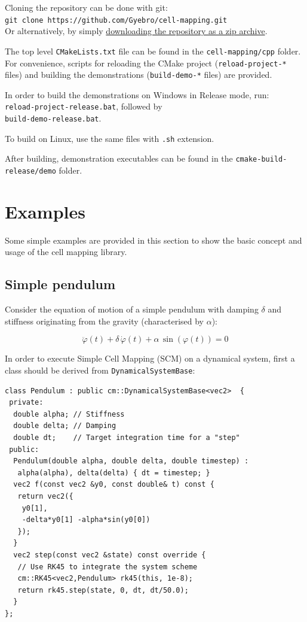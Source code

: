 \documentclass[11pt]{article}
\begin{document}
Cloning the repository can be done with git:\\
\texttt{git clone https://github.com/Gyebro/cell-mapping.git}\\
Or alternatively, by simply  \href{https://github.com/Gyebro/cell-mapping/archive/master.zip}{downloading the repository as a zip archive}.

The top level \texttt{CMakeLists.txt} file can be found in the \texttt{cell-mapping/cpp} folder. For convenience, scripts for reloading the CMake project (\texttt{reload-project-*} files) and building the demonstrations (\texttt{build-demo-*} files) are provided.

In order to build the demonstrations on Windows in Release mode, run:\\
\texttt{reload-project-release.bat}, followed by\\
\texttt{build-demo-release.bat}.

To build on Linux, use the same files with \texttt{.sh} extension.

After building, demonstration executables can be found in the \texttt{cmake-build-release/demo} folder.

\section{Examples}

Some simple examples are provided in this section to show the basic concept and usage of the cell mapping library.

\subsection{Simple pendulum}

Consider the equation of motion of a simple pendulum with damping $\delta$ and stiffness originating from the gravity (characterised by $\alpha$):

\[\ddot\varphi(t) + \delta\,\dot\varphi(t) + \alpha\,\sin(\varphi(t))=0\]

In order to execute Simple Cell Mapping (SCM) on a dynamical system, first a class should be derived from \texttt{DynamicalSystemBase}:

\begin{lstlisting}
class Pendulum : public cm::DynamicalSystemBase<vec2>  {
 private:
  double alpha; // Stiffness
  double delta; // Damping
  double dt;    // Target integration time for a "step"
 public:
  Pendulum(double alpha, double delta, double timestep) : 
   alpha(alpha), delta(delta) { dt = timestep; }
  vec2 f(const vec2 &y0, const double& t) const {
   return vec2({
    y0[1],
    -delta*y0[1] -alpha*sin(y0[0])
   });
  }
  vec2 step(const vec2 &state) const override {
   // Use RK45 to integrate the system scheme
   cm::RK45<vec2,Pendulum> rk45(this, 1e-8);
   return rk45.step(state, 0, dt, dt/50.0);
  }
};
\end{lstlisting}
\end{document}
